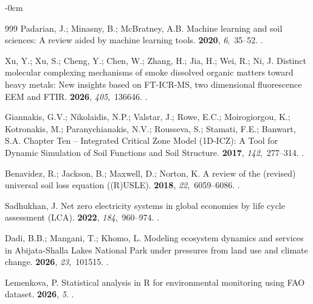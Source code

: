 \documentclass[environremediat,article,accept,pdftex,oneauthor]{Definitions/mdpi}
\begin{document}
\begin{adjustwidth}{-\extralength}{0cm}
\begin{thebibliography}{999}
Padarian, J.; Minasny, B.; McBratney, A.B.
\newblock Machine learning and soil sciences: A review aided by machine
  learning tools.
 {\bf 2020}, {\em 6},~35--52.
.

Xu, Y.; Xu, S.; Cheng, Y.; Chen, W.; Zhang, H.; Jia, H.; Wei, R.; Ni, J.
\newblock Distinct molecular complexing mechanisms of smoke dissolved organic
  matters toward heavy metals: New insights based on FT-ICR-MS, two dimensional
  fluorescence EEM and FTIR.
 {\bf 2026}, {\em 405},~136646.
.

Giannakis, G.V.; Nikolaidis, N.P.; Valstar, J.;  Rowe, E.C.; Moirogiorgou, K.; Kotronakis, M.; Paranychianakis, N.V.; Rousseva, S.; Stamati, F.E.; Banwart, S.A.
\newblock Chapter Ten -- Integrated Critical Zone Model (1D-ICZ): A Tool for
  Dynamic Simulation of Soil Functions and Soil Structure.
 {\bf 2017}, {\em 142},~277--314.
.

Benavidez, R.; Jackson, B.; Maxwell, D.; Norton, K.
\newblock A review of the (revised) universal soil loss equation ((R)USLE).
 {\bf 2018}, {\em
  22},~6059--6086.
.

Sadhukhan, J.
\newblock Net zero electricity systems in global economies by life cycle
  assessment (LCA).
 {\bf 2022}, {\em 184},~960--974.
.

Dadi, B.B.; Mangani, T.; Khomo, L.
\newblock Modeling ecosystem dynamics and services in Abijata-Shalla Lakes
  National Park under pressures from land use and climate change.
 {\bf 2026}, {\em 23},~101515.
.

Lemenkova, P.
\newblock Statistical analysis in R for environmental monitoring using FAO
  dataset.
 {\bf 2026}, {\em 5}. %
.


\end{thebibliography}
\end{adjustwidth}
\end{document}
